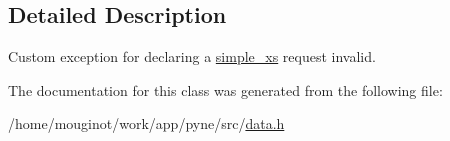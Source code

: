 \subsection{Detailed Description}
Custom exception for declaring a \hyperlink{structsimple__xs}{simple\+\_\+xs} request invalid. 

The documentation for this class was generated from the following file\+:\begin{DoxyCompactItemize}
\item 
/home/mouginot/work/app/pyne/src/\hyperlink{data_8h}{data.\+h}\end{DoxyCompactItemize}
